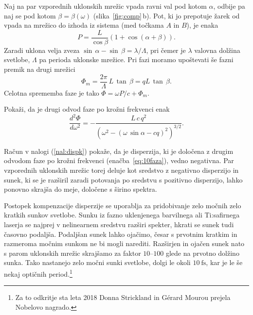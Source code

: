 Naj na par vzporednih uklonskih mrežic vpada ravni val pod kotom $\alpha$, odbije
pa naj se pod kotom $\beta = \beta(\omega)$ (slika~\ref{fig:comp}\,b). 
Pot, ki jo prepotuje žarek od vpada na mrežico 
do izhoda iz sistema (med točkama $A$ in $B$), je enaka 
\begin{equation}
P = \frac{L}{\cos\beta} \left(1+\cos(\alpha + \beta)\right).
\end{equation}
Zaradi uklona velja zveza $\sin\,\alpha - \sin\,\beta = \lambda/\Lambda$,
pri čemer je $\lambda$ valovna dolžina svetlobe, $\Lambda$ pa perioda uklonske mrežice. 
Pri fazi moramo upoštevati še fazni premik na drugi mrežici
\begin{equation}
\Phi_m=\frac{2\pi}{\Lambda} \, L \, \tan\,\beta = q L \,\tan\,\beta.
\end{equation}
Celotna sprememba faze je tako $\Phi = \omega P/c + \Phi_m$.

\begin{definition}
\label{nal:dispk}
Pokaži, da je drugi odvod faze po krožni frekvenci enak
\begin{equation}
\frac{d^2 \Phi}{d \omega^2} = - \frac{L\, c\, q^2}
{\left(\omega^2 - (\omega\, \sin\alpha - cq)^2\right)^{3/2}}.
\label{eq:10faza}
\end{equation}
\end{definition}
Račun v nalogi (\ref{nal:dispk})
pokaže, da je disperzija, ki je določena z drugim odvodom faze po krožni frekvenci
(enačba~\ref{eq:10faza}), vedno negativna. Par vzporednih uklonskih mrežic
torej deluje kot sredstvo
z negativno disperzijo in sunek, ki se je razširil zaradi potovanja
po sredstvu s pozitivno disperzijo, lahko ponovno skrajša do meje,
določene s širino spektra. 

\begin{remark}
Postopek kompenzacije disperzije se uporablja za pridobivanje zelo močnih zelo
kratkih sunkov svetlobe. Sunku iz fazno uklenjenega barvilnega 
ali Ti:safirnega
laserja se najprej v nelinearnem sredstvu razširi spekter, hkrati
se sunek tudi časovno podaljša. Podaljšan sunek lahko ojačimo, česar 
s prvotnim kratkim in razmeroma močnim sunkom ne bi mogli narediti. Razširjen
in ojačen sunek nato s parom uklonskih mrežic skrajšamo za 
faktor $10$--$100$ glede na prvotno dolžino sunka. Tako nastanejo zelo močni sunki
svetlobe, dolgi le okoli $10~\si{\femto\second}$, kar je le še nekaj optičnih 
period.\footnote{Za to odkritje sta leta 2018 Donna Strickland in
G\'erard Mourou prejela Nobelovo nagrado.}
\end{remark}

